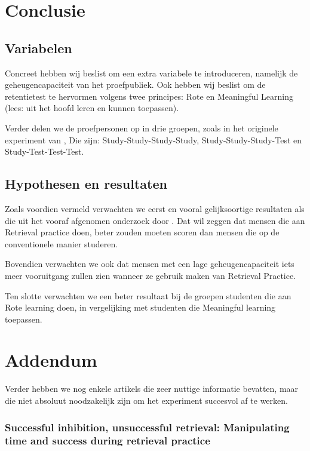 \documentclass{hogent-article}
\begin{document}
\section{Conclusie}

\subsection{Variabelen}
Concreet hebben wij beslist om een extra variabele te introduceren, namelijk de geheugencapaciteit van het proefpubliek. Ook hebben wij beslist om de retentietest te hervormen volgens twee principes: Rote en Meaningful Learning (lees: uit het hoofd leren en kunnen toepassen).\\
\par
\noindent    
Verder delen we de proefpersonen op in drie groepen, zoals in het originele experiment van \cite{Henry2006} , Die zijn: Study-Study-Study-Study, Study-Study-Study-Test  en Study-Test-Test-Test. 

\subsection{Hypothesen en resultaten}

\noindent
Zoals voordien vermeld verwachten we eerst en vooral gelijksoortige resultaten als die uit het vooraf afgenomen onderzoek door \cite{Henry2006}. Dat wil zeggen dat mensen die aan Retrieval practice doen, beter zouden moeten scoren dan mensen die op de conventionele manier studeren.\\
\par
\noindent
Bovendien verwachten we ook dat mensen met een lage geheugencapaciteit iets meer vooruitgang zullen zien wanneer ze gebruik maken van Retrieval Practice.\\
\par
\noindent
Ten slotte verwachten we een beter resultaat bij de groepen studenten die aan Rote learning doen, in vergelijking met studenten die Meaningful learning toepassen.


\section{Addendum}

Verder hebben we nog enkele artikels die zeer nuttige informatie bevatten, maar die niet absoluut noodzakelijk zijn om het experiment succesvol af te werken.

\subsubsection{Successful inhibition, unsuccessful retrieval: Manipulating time and success during retrieval practice}
\end{document}
